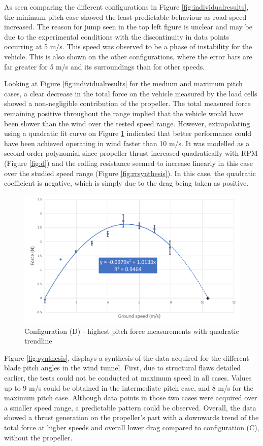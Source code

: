 As seen comparing the different configurations in Figure \ref{fig:individualresults}, the minimum pitch case showed the least predictable behaviour as road speed increased. The reason for jump seen in the top left figure is unclear and may be due to the experimental conditions with the discontinuity in data points occurring at 5 m/s. This speed was observed to be a phase of instability for the vehicle. This is also shown on the other configurations, where the error bars are far greater for 5 m/s and its surroundings than for other speeds. 
 
Looking at Figure \ref{fig:individualresults} for the medium and maximum pitch cases, a clear decrease in the total force on the vehicle measured by the load cells showed a non-negligible contribution of the propeller. The total measured force remaining positive throughout the range implied that the vehicle would have been slower than the wind over the tested speed range. However, extrapolating using a quadratic fit curve on Figure \ref{fig:trendlineplot} indicated that better performance could have been achieved operating in wind faster than 10 m/s. It was modelled as a second order polynomial since propeller thrust increased quadratically with RPM (Figure \ref{fig:d}) and the rolling resistance seemed to increase linearly in this case over the studied speed range (Figure \ref{fig:rrsynthesis}). In this case, the quadratic coefficient is negative, which is simply due to the drag being taken as positive.

\begin{figure}
    \centering
    \includegraphics[width=0.9\linewidth]{images/part11/trendline.png}
    \caption{Configuration (D) - highest pitch force measurements with quadratic trendline}
    \label{fig:trendlineplot}
\end{figure}

Figure \ref{fig:synthesis}, displays a synthesis of the data acquired for the different blade pitch angles in the wind tunnel. First, due to structural flaws detailed earlier, the tests could not be conducted at maximum speed in all cases. Values up to 9 m/s could be obtained in the intermediate pitch case, and 8 m/s for the maximum pitch case. Although data points in those two cases were acquired over a smaller speed range, a predictable pattern could be observed. Overall, the data showed a thrust generation on the propeller’s part with a downwards trend of the total force at higher speeds and overall lower drag compared to configuration (C), without the propeller. 

